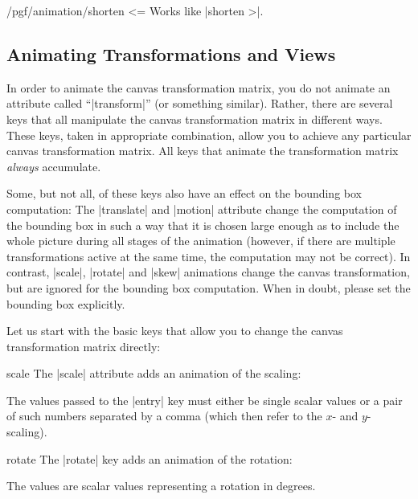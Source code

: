 \begin{key}{/pgf/animation/shorten <=}
    Works like |shorten >|.
\end{key}


\subsection{Animating Transformations  and Views}
\label{section-base-animation-views}

In order to animate the canvas transformation matrix, you do not animate an
attribute called ``|transform|'' (or something similar). Rather, there are
several keys that all manipulate the canvas transformation matrix in different
ways. These keys, taken in appropriate combination, allow you to achieve any
particular canvas transformation matrix. All keys that animate the
transformation matrix \emph{always} accumulate.

Some, but not all, of these keys also have an effect on the bounding box
computation: The |translate| and |motion| attribute change the computation of
the bounding box in such a way that it is chosen large enough as to include the
whole picture during all stages of the animation (however, if there are
multiple transformations active at the same time, the computation may not be
correct). In contrast, |scale|, |rotate| and |skew| animations change the
canvas transformation, but are ignored for the bounding box computation. When
in doubt, please set the bounding box explicitly.

Let us start with the basic keys that allow you to change the canvas
transformation matrix directly:

\begin{animateattribute}{scale}
    The |scale| attribute adds an animation of the scaling:
\begin{codeexample}[
    preamble={\usepgfmodule{animations}},
    animation list={0.5,1,1.5,2},
]
\end{codeexample}
    The values passed to the |entry| key must either be single scalar values or
    a pair of such numbers separated by a comma (which then refer to the $x$-
    and $y$-scaling).
\end{animateattribute}

\begin{animateattribute}{rotate}
    The |rotate| key adds an animation of the rotation:
\begin{codeexample}[
    preamble={\usepgfmodule{animations}},
    animation list={0.5,1,1.5,2},
]
\end{codeexample}
    The values are scalar values representing a rotation in degrees.
\end{animateattribute}

